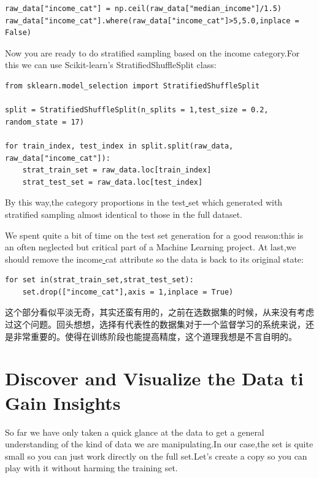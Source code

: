 \documentclass[UTF8]{ctexart}
\begin{document}
\begin{lstlisting}
raw_data["income_cat"] = np.ceil(raw_data["median_income"]/1.5)
raw_data["income_cat"].where(raw_data["income_cat"]>5,5.0,inplace = False)
\end{lstlisting}

Now you are ready to do stratified sampling based on the income category.For this we can use Scikit-learn's StratifiedShuffleSplit class:

\begin{lstlisting}
from sklearn.model_selection import StratifiedShuffleSplit

split = StratifiedShuffleSplit(n_splits = 1,test_size = 0.2, random_state = 17)

for train_index, test_index in split.split(raw_data, raw_data["income_cat"]):
    strat_train_set = raw_data.loc[train_index]
    strat_test_set = raw_data.loc[test_index]	
\end{lstlisting}

By this way,the category proportions in the test\underline{ }set which generated with stratified sampling almost identical to those in the full dataset.

We spent quite a bit of time on the test set generation for a good reason:this is an often neglected but critical part of a Machine Learning project.
At last,we should remove the income\underline{ }cat attribute so the data is back to its original state:

\begin{lstlisting}
for set in(strat_train_set,strat_test_set):
	set.drop(["income_cat"],axis = 1,inplace = True)
\end{lstlisting}


这个部分看似平淡无奇，其实还蛮有用的，之前在选数据集的时候，从来没有考虑过这个问题。回头想想，选择有代表性的数据集对于一个监督学习的系统来说，还是非常重要的。使得在训练阶段也能提高精度，这个道理我想是不言自明的。

\section{Discover and Visualize the Data ti Gain Insights}

So far we have only taken a quick glance at the data to get a general understanding of the kind of data we are manipulating.In our case,the set is quite small so you can just work directly on the full set.Let's create a copy so you can play with it without harming the training set.
\end{document}
